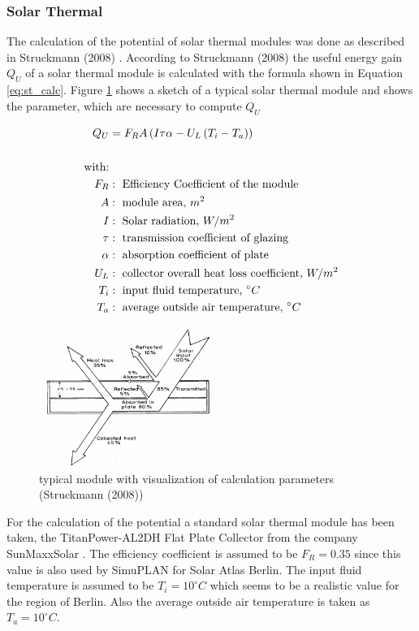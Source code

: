 \subsubsection{Solar Thermal}
The calculation of the potential of solar thermal modules was done as described in Struckmann (2008) . According to Struckmann (2008) the useful energy gain $Q_U$ of a solar thermal module is calculated with the formula shown in Equation \ref{eq:st_calc}. Figure \ref{fig:st_module} shows a sketch of a typical solar thermal module and shows the parameter, which are necessary to compute $Q_U$  

\begin{align}
\label{eq:st_calc}
Q_U &= F_R  A \left( I \tau \alpha - U_L \left(T_i - T_a \right) \right)\\\notag\\\notag
\text{with:}&\\\notag
F_R &:\text{ Efficiency Coefficient of the module}\\\notag
A &: \text{ module area, $m^2$}\\\notag
I &: \text{ Solar radiation, $W/m^2$ }\\\notag
\tau &: \text{ transmission coefficient of glazing}\\\notag
\alpha &: \text{ absorption coefficient of plate}\\\notag
U_L &: \text{ collector overall heat loss coefficient, $W/m^2$}\\\notag
T_i &: \text{ input fluid temperature, $^\circ C$}\\\notag
T_a &: \text{ average outside air temperature, $^\circ C$}\notag
\end{align}

\begin{figure}[ht]
	\centering
	\includegraphics[width=0.5\textwidth]{phase2/group2/figure/st_module.png}
	\caption{typical module with visualization of calculation parameters (Struckmann (2008))}
	\label{fig:st_module}
\end{figure}

For the calculation of the potential a standard solar thermal module has been taken, the TitanPower-AL2DH Flat Plate Collector from the company SunMaxxSolar . The efficiency coefficient is assumed to be $F_R = 0.35$ since this value is also used by SimuPLAN for Solar Atlas Berlin. The input fluid temperature is assumed to be $T_i = 10 ^\circ C$ which seems to be a realistic value for the region of Berlin.  Also the average outside air temperature is taken as  $T_a = 10 ^\circ C$.

